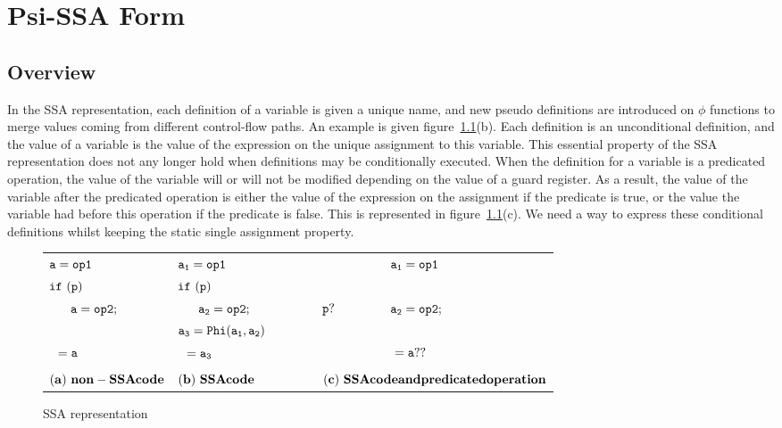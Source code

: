 \chapter{Psi-SSA Form }
\label{chap:psi_ssa}

\section{Overview}



In the SSA representation, each definition of a variable is given a
unique name, and new pseudo definitions are introduced on $\phi$
functions to merge values coming from different control-flow paths. An
example is given figure~\ref{fig:op_ssa}(b). Each definition is an
unconditional definition, and the value of a variable is the value of
the expression on the unique assignment to this variable. This
essential property of the SSA representation does not any longer hold
when definitions may be conditionally executed. When the definition
for a variable is a predicated operation, the value of the variable
will or will not be modified depending on the value of a guard
register. As a result, the value of the variable after the predicated
operation is either the value of the expression on the assignment if
the predicate is true, or the value the variable had before this
operation if the predicate is false. This is represented in
figure~\ref{fig:op_ssa}(c). We need a way to express these conditional
definitions whilst keeping the static single assignment property.

\begin{figure}
\begin{center}
\footnotesize
\begin{tabular}{llllll}
${\tt a = op1}$           &        & ${\tt a_1 = op1}$            &            &            & ${\tt a_1 = op1}$\\
${\tt if\ (p)}$           &        & ${\tt if\ (p)}$              &            &            & \\
${\tt\ \ \ \ \ a = op2;}$ & \ \ \  & ${\tt \ \ \ \ \ a_2 = op2;}$ & \ \ \ \ \  & ${\tt p?}$ & ${\tt a_2 = op2;}$ \\
                          &        & ${\tt a_3 = Phi(a_1, a_2)}$   &           &             & \\
${\tt \ \ = a}$           &        & ${\tt \ \ = a_3}$            &            &            & ${\tt \ = a??}$ \\
\\
\multicolumn{2}{l}{${\tt{\bf (a)\ non-SSA code}}$} & \multicolumn{2}{l}{${\tt{\bf (b)\ SSA code}}$}  & \multicolumn{2}{l}{${\tt{\bf (c)\ SSA code and predicated operation}}$}\\
\end{tabular}
\caption{SSA representation}
\label{fig:op_ssa}
\end{center}
\end{figure}

